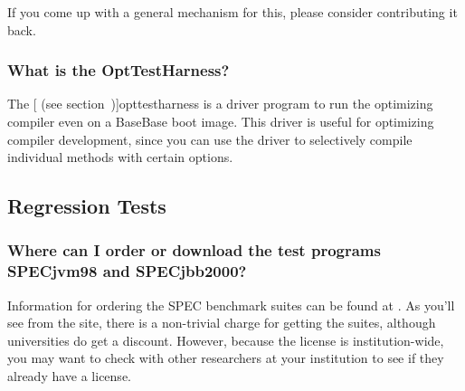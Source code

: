 If you come up with a general mechanism for this, please consider
contributing it back.

\subsubsection{What is the OptTestHarness?}

The [ (see section~\Ref)]{opttestharness} is a driver
program to run the optimizing compiler even on a BaseBase boot image.
This driver is useful for optimizing compiler development, since you
can use the driver to selectively compile individual methods with
certain options.

\subsection{Regression Tests}

\subsubsection{Where can I order or download the test programs 
  SPECjvm\Rheadingweb{}98 and SPECjbb\Rheadingweb{}2000?}

Information for ordering the SPEC\Rweb{} benchmark suites can be found at
.
As you'll see from the site, there is a non-trivial charge for getting the
suites, although universities do get a discount.
However, because the license is institution-wide, you may want to check with
other researchers at your institution to see if they already have a license.

